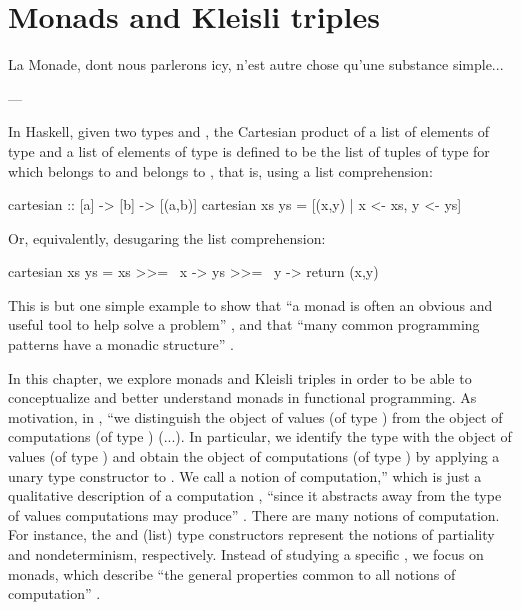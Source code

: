 \chapter{Monads and Kleisli triples}
\label{chap:monads}

\epigraph{
  La Monade, dont nous parlerons icy, n'est autre chose qu'une
  substance simple...
}{---\textcite[1]{leibniz-1714}}

In Haskell, given two types  and , the
Cartesian product of a list  of elements of type
 and a list  of elements of type
 is defined to be the list of tuples
 of type  for which
 belongs to  and 
belongs to , that is, using a list comprehension:
\begin{codehaskell}
cartesian :: [a] -> [b] -> [(a,b)]
cartesian xs ys = [(x,y) | x <- xs, y <- ys]
\end{codehaskell}
Or, equivalently, desugaring the list comprehension:
\begin{codehaskell}
cartesian xs ys = xs >>= \ x -> ys >>= \ y -> return (x,y)
\end{codehaskell}
This is but one simple example to show that ``a monad is often an
obvious and useful tool to help solve a problem''
\parencite[325]{osullivan-2008}, and that ``many common programming
patterns have a monadic structure'' \parencite[328]{osullivan-2008}.

In this chapter, we explore monads and Kleisli triples in order to be
able to conceptualize and better understand monads in functional
programming. As motivation, in \hask, ``we distinguish the object
 of values (of type ) from the object
 of computations (of type ) (...). In
particular, we identify the type  with the object of
values (of type ) and obtain the object of computations
(of type ) by applying a unary type constructor
 to . We call  a notion
of computation,'' which is just a qualitative description of a
computation \parencite[17]{moggi-1989}, ``since it abstracts away from
the type of values computations may produce''
\parencite[57--58]{moggi-1991}. There are many notions of computation.
For instance, the  and \texthaskell{[]} (list) type
constructors represent the notions of partiality and nondeterminism,
respectively. Instead of studying a specific , we focus
on monads, which describe ``the general properties common to all
notions of computation'' \parencite[58]{moggi-1991}.

